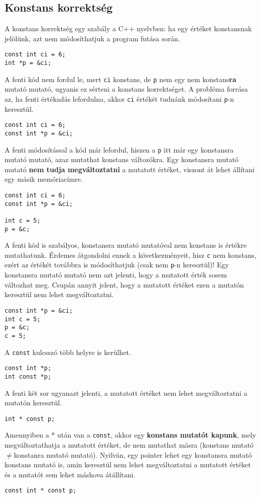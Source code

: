 \documentclass[a4paper,11.5pt,table]{article}
\begin{document}
	\subsection{Konstans korrektség}
	A konstans korrektség egy szabály a C++ nyelvben: ha egy értéket konstansnak jelölünk, azt nem módosíthatjuk a program futása során.
	\begin{lstlisting}
const int ci = 6;
int *p = &ci;
	\end{lstlisting}
	A fenti kód nem fordul le, mert \texttt{ci} konstans, de \texttt{p} nem egy nem konstans\textbf{ra} mutató mutató, ugyanis ez sérteni a konstans korrektséget. A probléma forrása az, ha fenti értékadás lefordulna, akkor \texttt{ci} értékét tudnánk módosítani \texttt{p}-n keresztül.
	\begin{lstlisting}
const int ci = 6;
const int *p = &ci;
	\end{lstlisting}
	A fenti módosítással a kód már lefordul, hiszen a \texttt{p} itt már egy konstansra mutató mutató, azaz mutathat konstans változókra. Egy konstansra mutató mutató \textbf{nem tudja megváltoztatni} a mutatott értéket, viszont át lehet állítani egy másik memóriacímre.
	\begin{lstlisting}
const int ci = 6;
const int *p = &ci;

int c = 5;
p = &c;
	\end{lstlisting}
	A fenti kód is szabályos, konstansra mutató mutatóval nem konstans is értékre mutathatunk. Érdemes átgondolni ennek a következményeit, hisz \texttt{c} nem konstans, ezért az értékét továbbra is módosíthatjuk (csak nem \texttt{p}-n keresztül)! Egy konstansra mutató mutató nem azt jelenti, hogy a mutatott érték sosem változhat meg. Csupán annyit jelent, hogy a mutatott értéket ezen a mutatón keresztül nem lehet megváltoztatni.
	\begin{lstlisting}
const int *p = &ci;
int c = 5;
p = &c;
c = 5;
	\end{lstlisting}
	A \texttt{const} kulcsszó több helyre is kerülhet.
	\begin{lstlisting}
const int *p;
int const *p;
	\end{lstlisting}
	A fenti két sor ugyanazt jelenti, a mutatott értéket nem lehet megváltoztatni a mutatón keresztül.
	\begin{lstlisting}
int * const p;
	\end{lstlisting} 
	Amennyiben a * után van a \texttt{const}, akkor egy \textbf{konstans mutatót kapunk}, mely megváltoztathatja a mutatott értéket, de nem mutathat másra (konstans mutató\quad$\not=$\quad konstanra mutató mutató). Nyilván, egy pointer lehet egy konstansra mutató konstans mutató is, amin keresztül nem lehet megváltoztatni a mutatott értéket és a mutatót sem lehet máshova átállítani.
	\begin{lstlisting}
const int * const p;
	\end{lstlisting}
\end{document}
